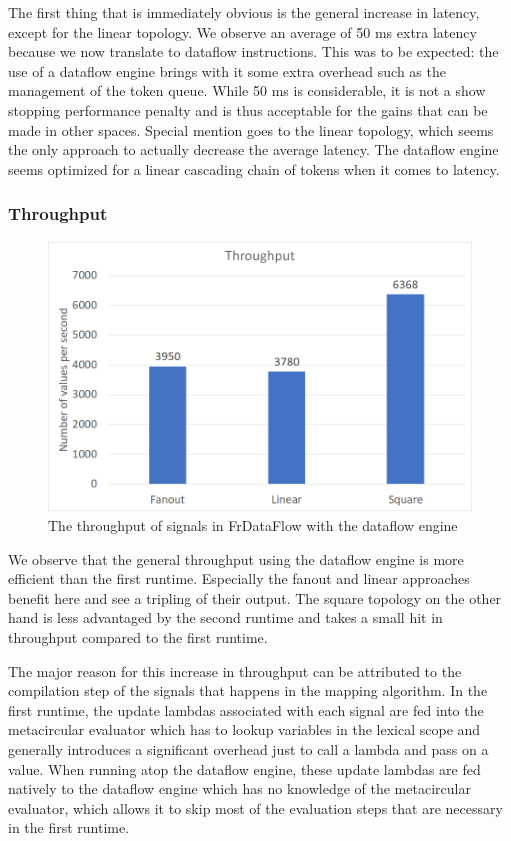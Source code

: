 The first thing that is immediately obvious is the general increase in latency, except for the linear topology. We observe an average of 50 ms extra latency because we now translate to dataflow instructions. This was to be expected: the use of a dataflow engine brings with it some extra overhead such as the management of the token queue. While 50 ms is considerable, it is not a show stopping performance penalty and is thus acceptable for the gains that can be made in other spaces. Special mention goes to the linear topology, which seems the only approach to actually decrease the average latency. The dataflow engine seems optimized for a linear cascading chain of tokens when it comes to latency.

\subsubsection{Throughput}

\begin{figure}[h]
	\includegraphics[width=\textwidth]{images/Evaluation-WithDataFlow-Throughput.png}
	\caption{The throughput of signals in FrDataFlow with the dataflow engine}
	\label{fig:evaluation-withdataflow-throughput}
\end{figure}

We observe that the general throughput using the dataflow engine is more efficient than the first runtime. 
Especially the fanout and linear approaches benefit here and see a tripling of their output. The square topology on the other hand is less advantaged by the second runtime and takes a small hit in throughput compared to the first runtime.

The major reason for this increase in throughput can be attributed to the compilation step of the signals that happens in the mapping algorithm. In the first runtime, the update lambdas associated with each signal are fed into the metacircular evaluator which has to lookup variables in the lexical scope and generally introduces a significant overhead just to call a lambda and pass on a value. When running atop the dataflow engine, these update lambdas are fed natively to the dataflow engine which has no knowledge of the metacircular evaluator, which allows it to skip most of the evaluation steps that are necessary in the first runtime.

